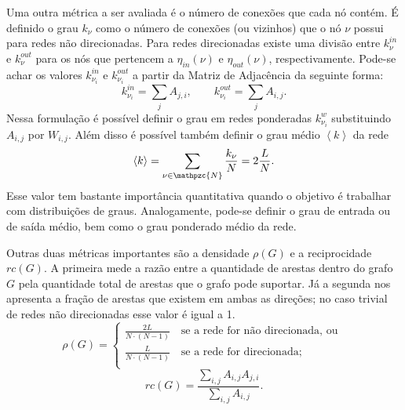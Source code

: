 Uma outra métrica a ser avaliada é o número de conexões que cada nó contém. É definido o grau $k_{\nu}$ como o número de conexões (ou vizinhos) que o nó $\nu$ possui para redes não direcionadas. Para redes direcionadas existe uma divisão entre $k^{in}_{\nu}$ e $k^{out}_{\nu}$ para os nós que pertencem a $\eta_{in}(\nu)$ e $\eta_{out}(\nu)$, respectivamente. Pode-se achar os valores $k^{in}_{\nu_i}$ e $k^{out}_{\nu_i}$ a partir da Matriz de Adjacência da seguinte forma:
\begin{equation}
    k^{in}_{\nu_i} = \sum_{j} A_{j,i}, \qquad  k^{out}_{\nu_i} = \sum_{j} A_{i,j}.
\end{equation}
Nessa formulação é possível definir o grau em redes ponderadas  
$k^w_{\nu_i}$ substituindo $A_{i,j}$ por $W_{i,j}$. 
Além disso é possível também definir o grau médio $\left\langle k \right\rangle$ da rede
\begin{equation}
  \left\langle k \right\rangle = \sum\limits_{\nu\in\mathpzc{N}}\frac{k_{\nu}}{N} = 2\frac{L}{N}.
  \label{grau_tamanho}
\end{equation}
Esse valor tem bastante importância quantitativa quando o objetivo é trabalhar com distribuições de graus.
Analogamente, pode-se definir o grau de entrada ou de saída médio, bem como o grau ponderado médio da rede.

Outras duas métricas importantes são a densidade $\rho(G)$ e a reciprocidade $rc(G)$. A primeira mede a razão entre a quantidade de arestas dentro do grafo $G$ pela quantidade total de arestas que o grafo pode suportar. Já a segunda nos apresenta a fração de arestas que existem em ambas as direções; no caso trivial de redes não direcionadas esse valor é igual a 1.
\[   
  \rho(G) = 
     \begin{cases}
      \frac{2L}{N\cdot(N-1)} \quad \text{se a rede for não direcionada, ou }\\
      \frac{L}{N\cdot(N-1)} \quad \text{se a rede for direcionada;} \\
     \end{cases}
\]
\begin{equation}
  rc(G) = \frac{\sum\limits_{i,j} A_{i,j}A_{j,i}}{\sum\limits_{i,j } A_{i,j}}.
\end{equation}

